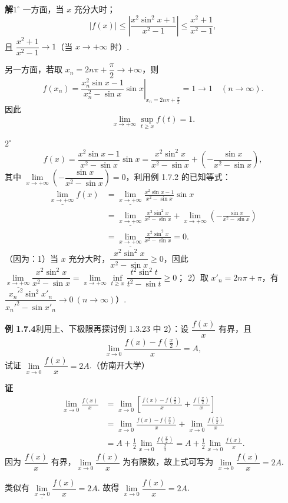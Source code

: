 \documentclass[UTF8, 12pt, fontset=fandol, oneside]{ctexart}
\begin{document}
\noindent\textbf{解}\quad $1^\circ$ 一方面，当 $x$ 充分大时；
\[
  |f(x)|\le \left|\frac{x^2\sin^2 x+1}{x^2-1}\right|\le \frac{x^2+1}{x^2-1},
\]
且 $\dfrac{x^2+1}{x^2-1}\to1$（当 $x\to+\infty$ 时）.

另一方面，若取 $x_n=2n\pi+\dfrac\pi2\to+\infty$，则
\[
  f(x_n)=\left.\frac{x_n^2\sin x-1}{x_n^2-\sin x}\sin x\right|_{x_n=2n\pi+\frac\pi2}
  =1\to1\quad(n\to\infty).
\]
因此
\[
  \lim_{x\to+\infty}\sup_{t\ge x}f(t)=1.
\]

$2^\circ$
\[
  f(x)=\frac{x^2\sin x-1}{x^2-\sin x}\sin x
  =\frac{x^2\sin^2 x}{x^2-\sin x}+\left(-\frac{\sin x}{x^2-\sin x}\right),
\]
其中 $\lim\limits_{x\to+\infty}\left(-\dfrac{\sin x}{x^2-\sin x}\right)=0$，利用例 1.7.2 的已知等式：
\[
\begin{aligned}
  \underline{\lim_{x\to+\infty}}f(x)
  &=\underline{\lim_{x\to+\infty}}\frac{x^2\sin x-1}{x^2-\sin x}\sin x\\
  &=\underline{\lim_{x\to+\infty}}\frac{x^2\sin^2 x}{x^2-\sin x}
    +\lim_{x\to+\infty}\left(-\frac{\sin x}{x^2-\sin x}\right)\\
  &=\underline{\lim_{x\to+\infty}}\frac{x^2\sin^2 x}{x^2-\sin x}=0.
\end{aligned}
\]
（因为：1）当 $x$ 充分大时，$\dfrac{x^2\sin^2 x}{x^2-\sin x}\ge0$，因此
$\underline{\lim\limits_{x\to+\infty}}\dfrac{x^2\sin^2 x}{x^2-\sin x}
=\lim\limits_{x\to+\infty}\inf\limits_{t\ge x}\dfrac{t^2\sin^2 t}{t^2-\sin t}\ge0$；
2）取 $x'_n=2n\pi+\pi$，有 $\dfrac{x_n'^2\sin^2 x'_n}{x_n'^2-\sin x'_n}\to0\ (n\to\infty)$）.

\noindent\textbf{例 1.7.4}\quad 利用上、下极限再探讨例 1.3.23 中 2）：设 $\dfrac{f(x)}x$ 有界，且
\[
  \lim_{x\to0}\frac{f(x)-f\left(\frac{x}{2}\right)}x=A,
\]
试证 $\lim\limits_{x\to0}\dfrac{f(x)}x=2A$.（仿南开大学）

\noindent\textbf{证}\quad
\[
\begin{aligned}
  \lim_{x\to0}\frac{f(x)}x
  &=\lim_{x\to0}\left[\frac{f(x)-f\left(\frac{x}{2}\right)}x+\frac{f\left(\frac{x}{2}\right)}x\right]\\
  &=\lim_{x\to0}\frac{f(x)-f\left(\frac{x}{2}\right)}x+\lim_{x\to0}\frac{f\left(\frac{x}{2}\right)}x\\
  &=A+\frac12\lim_{x\to0}\frac{f\left(\frac{x}{2}\right)}{\frac{x}{2}}
   =A+\frac12\lim_{x\to0}\frac{f(x)}x.
\end{aligned}
\]
因为 $\dfrac{f(x)}x$ 有界，$\lim\limits_{x\to0}\dfrac{f(x)}x$ 为有限数，故上式可写为 $\lim\limits_{x\to0}\dfrac{f(x)}x=2A$.

类似有 $\underline{\lim\limits_{x\to0}}\dfrac{f(x)}x=2A$. 故得 $\lim\limits_{x\to0}\dfrac{f(x)}x=2A$.
\end{document}
